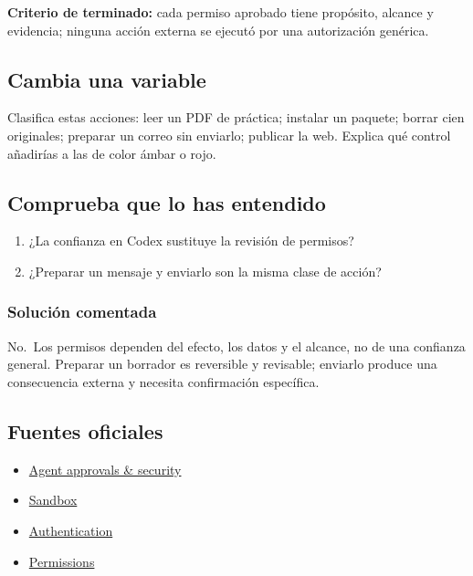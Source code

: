 \documentclass[10pt,a4paper,openany]{book}
\providecommand{\tightlist}{\setlength{\itemsep}{0.18em}\setlength{\parskip}{0pt}}
\begin{document}
\begin{successbox}

\textbf{Criterio de terminado:} cada permiso aprobado tiene propósito,
alcance y evidencia; ninguna acción externa se ejecutó por una
autorización genérica.

\end{successbox}

\subsection{Cambia una variable}\label{cambia-una-variable-13}

Clasifica estas acciones: leer un PDF de práctica; instalar un paquete;
borrar cien originales; preparar un correo sin enviarlo; publicar la
web. Explica qué control añadirías a las de color ámbar o rojo.

\subsection{Comprueba que lo has
entendido}\label{comprueba-que-lo-has-entendido-13}

\begin{enumerate}
\def\labelenumi{\arabic{enumi}.}
\tightlist
\item
  ¿La confianza en Codex sustituye la revisión de permisos?
\item
  ¿Preparar un mensaje y enviarlo son la misma clase de acción?
\end{enumerate}

\subsubsection{Solución comentada}\label{soluciuxf3n-comentada-14}

No.~Los permisos dependen del efecto, los datos y el alcance, no de una
confianza general. Preparar un borrador es reversible y revisable;
enviarlo produce una consecuencia externa y necesita confirmación
específica.

\subsection{Fuentes oficiales}\label{fuentes-oficiales-13}

\begin{itemize}
\tightlist
\item
  \href{https://learn.chatgpt.com/docs/agent-approvals-security}{Agent
  approvals \& security}
\item
  \href{https://learn.chatgpt.com/docs/sandboxing}{Sandbox}
\item
  \href{https://learn.chatgpt.com/docs/auth}{Authentication}
\item
  \href{https://learn.chatgpt.com/docs/permissions}{Permissions}
\end{itemize}
\end{document}
